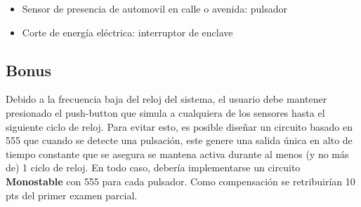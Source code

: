 \begin{itemize}
    \item Sensor de presencia de automovil en calle o avenida: pulsador
    \item Corte de energía eléctrica: interruptor de enclave
\end{itemize}  

\subsection{Bonus}
Debido a la frecuencia baja del reloj del sistema, el usuario debe mantener presionado el push-button que simula a cualquiera de los sensores hasta el siguiente ciclo de reloj.
Para evitar esto, es posible diseñar un circuito basado en 555 que cuando se detecte una pulsación, este genere una salida única en alto de tiempo constante que se asegura se
mantena activa durante al menos (y no más de) 1 ciclo de reloj. En todo caso, debería implementarse un circuito \textbf{Monostable} con 555 para cada pulsador. Como compensación
se retribuirían 10 pts del primer examen parcial.